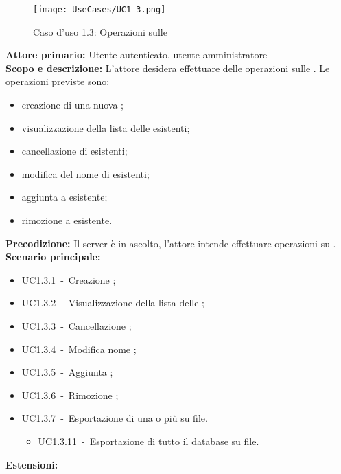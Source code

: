 \documentclass{scalatekids-article}
\begin{document}
\begin{figure}[H]
  \begin{center}
    \texttt{[image: UseCases/UC1\_3.png]}
    \caption{Caso d'uso 1.3: Operazioni sulle }
  \end{center}
\end{figure}
\textbf{Attore primario:} Utente autenticato, utente amministratore\\
\textbf{Scopo e descrizione:} L'attore desidera effettuare delle operazioni sulle . Le operazioni previste sono:
\begin{itemize}
\item creazione di una nuova ;
\item visualizzazione della lista delle  esistenti;
\item cancellazione di  esistenti;
\item modifica del nome di  esistenti;
\item aggiunta  a  esistente;
\item rimozione  a  esistente.
\end{itemize}
\textbf{Precodizione:} Il server è in ascolto, l'attore intende effettuare operazioni su .\\
\textbf{Scenario principale:}
\begin{itemize}
\item UC1.3.1\ -\ Creazione ;
\item UC1.3.2\ -\ Visualizzazione della lista delle ;
\item UC1.3.3\ -\ Cancellazione ;
\item UC1.3.4\ -\ Modifica nome ;
\item UC1.3.5\ -\ Aggiunta ;
\item UC1.3.6\ -\ Rimozione ;
\item UC1.3.7\ -\ Esportazione di una o più  su file.
  \begin{itemize}
  \item UC1.3.11\ -\ Esportazione di tutto il database su file.
  \end{itemize}
\end{itemize}
\textbf{Estensioni:}
\end{document}
